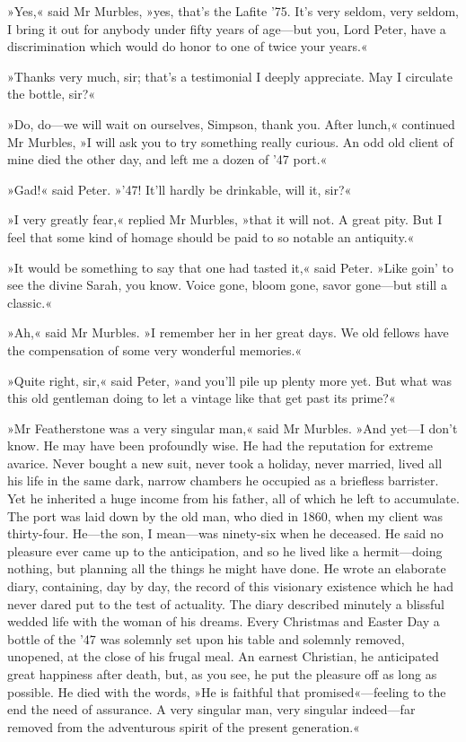 »Yes,« said Mr Murbles, »yes, that's the Lafite '75. It's very seldom, very seldom, I bring it out for anybody under fifty years of age\allowbreak---\allowbreak but you, Lord Peter, have a discrimination which would do honor to one of twice your years.«

»Thanks very much, sir; that's a testimonial I deeply appreciate. May I circulate the bottle, sir?«

»Do, do\allowbreak---\allowbreak we will wait on ourselves, Simpson, thank you. After lunch,« continued Mr Murbles, »I will ask you to try something really curious.  An odd old client of mine died the other day, and left me a dozen of '47 port.«

»Gad!« said Peter. »'47! It'll hardly be drinkable, will it, sir?«

»I very greatly fear,« replied Mr Murbles, »that it will not. A great pity. But I feel that some kind of homage should be paid to so notable an antiquity.«

»It would be something to say that one had tasted it,« said Peter. »Like goin' to see the divine Sarah, you know. Voice gone, bloom gone, savor gone\allowbreak---\allowbreak but still a classic.«

»Ah,« said Mr Murbles. »I remember her in her great days. We old fellows have the compensation of some very wonderful memories.«

»Quite right, sir,« said Peter, »and you'll pile up plenty more yet.  But what was this old gentleman doing to let a vintage like that get past its prime?«

»Mr Featherstone was a very singular man,« said Mr Murbles. »And yet\allowbreak---\allowbreak I don't know. He may have been profoundly wise. He had the reputation for extreme avarice. Never bought a new suit, never took a holiday, never married, lived all his life in the same dark, narrow chambers he occupied as a briefless barrister. Yet he inherited a huge income from his father, all of which he left to accumulate. The port was laid down by the old man, who died in 1860, when my client was thirty-four. He\allowbreak---\allowbreak the son, I mean\allowbreak---\allowbreak was ninety-six when he deceased. He said no pleasure ever came up to the anticipation, and so he lived like a hermit\allowbreak---\allowbreak doing nothing, but planning all the things he might have done. He wrote an elaborate diary, containing, day by day, the record of this visionary existence which he had never dared put to the test of actuality. The diary described minutely a blissful wedded life with the woman of his dreams. Every Christmas and Easter Day a bottle of the '47 was solemnly set upon his table and solemnly removed, unopened, at the close of his frugal meal. An earnest Christian, he anticipated great happiness after death, but, as you see, he put the pleasure off as long as possible. He died with the words, »He is faithful that promised«---feeling to the end the need of assurance. A very singular man, very singular indeed\allowbreak---\allowbreak far removed from the adventurous spirit of the present generation.«

